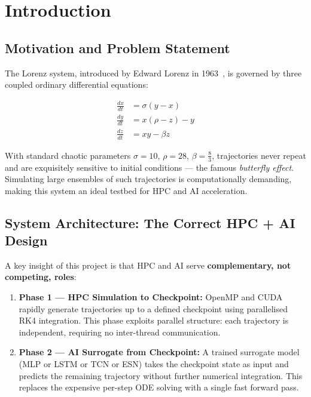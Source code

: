 \documentclass[11pt,a4paper]{article}
\begin{document}
\tableofcontents
\newpage
\listoffigures
\listoftables
\newpage

\section{Introduction}

\subsection{Motivation and Problem Statement}

The Lorenz system, introduced by Edward Lorenz in 1963~\cite{lorenz1963}, is governed
by three coupled ordinary differential equations:

\begin{align}
  \frac{dx}{dt} &= \sigma(y - x) \label{eq:lx}\\
  \frac{dy}{dt} &= x(\rho - z) - y \label{eq:ly}\\
  \frac{dz}{dt} &= xy - \beta z \label{eq:lz}
\end{align}

With standard chaotic parameters $\sigma=10$, $\rho=28$, $\beta=\tfrac{8}{3}$,
trajectories never repeat and are exquisitely sensitive to initial conditions ---
the famous \textit{butterfly effect}. Simulating large ensembles of such trajectories
is computationally demanding, making this system an ideal testbed for HPC and AI
acceleration.

\subsection{System Architecture: The Correct HPC + AI Design}

A key insight of this project is that HPC and AI serve \textbf{complementary, not
competing, roles}:

\begin{enumerate}
  \item \textbf{Phase 1 --- HPC Simulation to Checkpoint:} OpenMP and CUDA rapidly
        generate trajectories up to a defined checkpoint using parallelised RK4
        integration. This phase exploits parallel structure: each
        trajectory is independent, requiring no inter-thread communication.
  \item \textbf{Phase 2 --- AI Surrogate from Checkpoint:} A trained surrogate model
        (MLP or LSTM or TCN or ESN) takes the checkpoint state as input and predicts the remaining
        trajectory without further numerical integration. This replaces the expensive
        per-step ODE solving with a single fast forward pass.
\end{enumerate}
\end{document}
